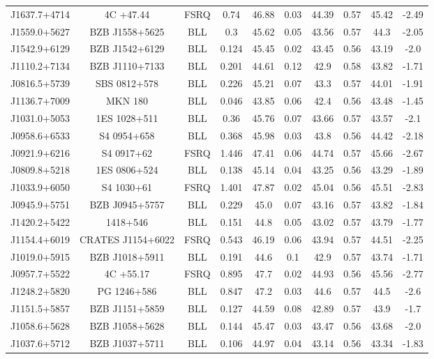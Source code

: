 \documentclass[12pt]{article}
\begin{document}
\begin{landscape}
\begin{longtable}{cccccccccc}
J1637.7+4714 & 4C +47.44 & FSRQ & 0.74 & 46.88 & 0.03 & 44.39 & 0.57 & 45.42 & -2.49 \\
J1559.0+5627 & BZB J1558+5625 & BLL & 0.3 & 45.62 & 0.05 & 43.56 & 0.57 & 44.3 & -2.05 \\
J1542.9+6129 & BZB J1542+6129 & BLL & 0.124 & 45.45 & 0.02 & 43.45 & 0.56 & 43.19 & -2.0 \\
J1110.2+7134 & BZB J1110+7133 & BLL & 0.201 & 44.61 & 0.12 & 42.9 & 0.58 & 43.82 & -1.71 \\
J0816.5+5739 & SBS 0812+578 & BLL & 0.226 & 45.21 & 0.07 & 43.3 & 0.57 & 44.01 & -1.91 \\
J1136.7+7009 & MKN 180 & BLL & 0.046 & 43.85 & 0.06 & 42.4 & 0.56 & 43.48 & -1.45 \\
J1031.0+5053 & 1ES 1028+511 & BLL & 0.36 & 45.76 & 0.07 & 43.66 & 0.57 & 43.57 & -2.1 \\
J0958.6+6533 & S4 0954+658 & BLL & 0.368 & 45.98 & 0.03 & 43.8 & 0.56 & 44.42 & -2.18 \\
J0921.9+6216 & S4 0917+62 & FSRQ & 1.446 & 47.41 & 0.06 & 44.74 & 0.57 & 45.66 & -2.67 \\
J0809.8+5218 & 1ES 0806+524 & BLL & 0.138 & 45.14 & 0.04 & 43.25 & 0.56 & 43.29 & -1.89 \\
J1033.9+6050 & S4 1030+61 & FSRQ & 1.401 & 47.87 & 0.02 & 45.04 & 0.56 & 45.51 & -2.83 \\
J0945.9+5751 & BZB J0945+5757 & BLL & 0.229 & 45.0 & 0.07 & 43.16 & 0.57 & 43.82 & -1.84 \\
J1420.2+5422 & 1418+546 & BLL & 0.151 & 44.8 & 0.05 & 43.02 & 0.57 & 43.79 & -1.77 \\
J1154.4+6019 & CRATES J1154+6022 & FSRQ & 0.543 & 46.19 & 0.06 & 43.94 & 0.57 & 44.51 & -2.25 \\
J1019.0+5915 & BZB J1018+5911 & BLL & 0.191 & 44.6 & 0.1 & 42.9 & 0.57 & 43.74 & -1.71 \\
J0957.7+5522 & 4C +55.17 & FSRQ & 0.895 & 47.7 & 0.02 & 44.93 & 0.56 & 45.56 & -2.77 \\
J1248.2+5820 & PG 1246+586 & BLL & 0.847 & 47.2 & 0.03 & 44.6 & 0.57 & 44.5 & -2.6 \\
J1151.5+5857 & BZB J1151+5859 & BLL & 0.127 & 44.59 & 0.08 & 42.89 & 0.57 & 43.9 & -1.7 \\
J1058.6+5628 & BZB J1058+5628 & BLL & 0.144 & 45.47 & 0.03 & 43.47 & 0.56 & 43.68 & -2.0 \\
J1037.6+5712 & BZB J1037+5711 & BLL & 0.106 & 44.97 & 0.04 & 43.14 & 0.56 & 43.34 & -1.83 \\

\end{longtable}
\end{landscape}
\end{document}
